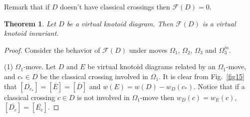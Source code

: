 \documentclass[11pt]{amsart}
\theoremstyle{noparens}
\newtheorem{theorem}{Theorem}[section]
\numberwithin{equation}{section}
\numberwithin{equation}{section}
\begin{document}
Remark that if $D$ doesn't have classical crossings then $\mathcal{F} (D) = 0$.

\begin{theorem}\label{th3.1}
Let $D$ be a virtual knotoid diagram. Then $\mathcal{F} (D)$ is a virtual knotoid invariant.
\end{theorem}


\begin{proof} 	
Consider the behavior of $\mathcal{F} (D)$ under moves $\Omega_1$, $\Omega_2$, $\Omega_3$ and $\Omega^m_3$.
	
(1) $\Omega_1$-move.   
Let $D$ and $E$ be virtual knotoid diagrams related by an $\Omega_1$-move, and $c_* \in D$ be the classical crossing  involved in $\Omega_1$. It is clear from Fig.~\ref{fig15} that $[\overline{D_{c_*}} ]= [\overline{E}] = [\overline{D}]$ and $w(E) = w(D) - w_D(c_*)$. Notice that if a classical crossing $c \in D$ is not involved in $\Omega_1$-move then $w_D(c)=w_E(c)$, $[\overline{D_c}] = [\overline{E_c}]$. 


\end{proof}
\end{document}

